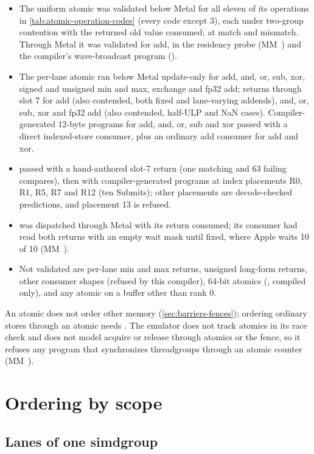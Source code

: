 \begin{itemize}
\item The uniform atomic was validated below Metal for all eleven of its operations in \cref{tab:atomic-operation-codes} (every code except 3), each under two-group
  contention with the returned old value consumed;  at match and
  mismatch. Through Metal it was validated for add, in the residency probe (MM~)
  and the compiler's wave-broadcast program ().
\item The per-lane atomic ran below Metal update-only for add, and, or, sub, xor, signed and unsigned min and max, exchange and
  fp32 add; returns through slot 7 for add (also contended, both fixed and lane-varying addends), and, or, sub, xor and
  fp32 add (also contended, half-ULP and NaN cases). Compiler-generated 12-byte programs for add, and, or, sub and xor
  passed with a direct indexed-store consumer, plus an ordinary add consumer for add and xor.
\item {} passed with a hand-authored slot-7 return (one matching and 63 failing compares), then with
  compiler-generated programs at index placements R0, R1, R5, R7 and R12 (ten Submits); other placements are decode-checked
  predictions, and placement 13 is refused.
\item {} was dispatched through Metal with its return consumed; its  consumer had read both returns with an empty wait mask until fixed, where Apple waits 10 of 10 (MM~).
\item Not validated are per-lane min and max returns, unsigned long-form returns, other consumer shapes (refused by this
  compiler), 64-bit atomics (, compiled only), and any atomic on a buffer other
  than rank 0.
\end{itemize}

An atomic does not order other memory (\cref{sec:barriers-fences}); ordering ordinary stores through an atomic needs
. The emulator does not
track atomics in its race check and does not model acquire or release through atomics or the fence, so it refuses any
program that synchronizes threadgroups through an atomic counter (MM~).

\section{Ordering by scope}\label{sec:ordering-across-lanes}

\subsection*{Lanes of one simdgroup}


